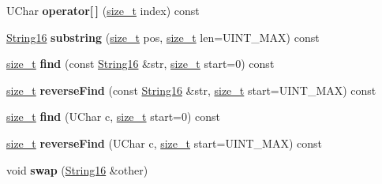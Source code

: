 \begin{DoxyCompactItemize}
\item 
\mbox{\label{classv8__inspector_1_1String16_aee5352dc73538db8d79e5294c1b04203}} 
U\+Char {\bfseries operator\mbox{[}$\,$\mbox{]}} (\mbox{\hyperlink{classsize__t}{size\+\_\+t}} index) const
\item 
\mbox{\label{classv8__inspector_1_1String16_a045c0dd80e0718d7dd9a0443d783c4ef}} 
\mbox{\hyperlink{classv8__inspector_1_1String16}{String16}} {\bfseries substring} (\mbox{\hyperlink{classsize__t}{size\+\_\+t}} pos, \mbox{\hyperlink{classsize__t}{size\+\_\+t}} len=U\+I\+N\+T\+\_\+\+M\+AX) const
\item 
\mbox{\label{classv8__inspector_1_1String16_aadd53e8ebc365e3df8ba64a9f5720875}} 
\mbox{\hyperlink{classsize__t}{size\+\_\+t}} {\bfseries find} (const \mbox{\hyperlink{classv8__inspector_1_1String16}{String16}} \&str, \mbox{\hyperlink{classsize__t}{size\+\_\+t}} start=0) const
\item 
\mbox{\label{classv8__inspector_1_1String16_ab0c7c214297bd4bf52c12ab1d07d7294}} 
\mbox{\hyperlink{classsize__t}{size\+\_\+t}} {\bfseries reverse\+Find} (const \mbox{\hyperlink{classv8__inspector_1_1String16}{String16}} \&str, \mbox{\hyperlink{classsize__t}{size\+\_\+t}} start=U\+I\+N\+T\+\_\+\+M\+AX) const
\item 
\mbox{\label{classv8__inspector_1_1String16_aeec2bc3331cc96ef6af2c78d6f6f9bca}} 
\mbox{\hyperlink{classsize__t}{size\+\_\+t}} {\bfseries find} (U\+Char c, \mbox{\hyperlink{classsize__t}{size\+\_\+t}} start=0) const
\item 
\mbox{\label{classv8__inspector_1_1String16_a06de0092541814d6bc837717d866141a}} 
\mbox{\hyperlink{classsize__t}{size\+\_\+t}} {\bfseries reverse\+Find} (U\+Char c, \mbox{\hyperlink{classsize__t}{size\+\_\+t}} start=U\+I\+N\+T\+\_\+\+M\+AX) const
\item 
\mbox{\label{classv8__inspector_1_1String16_a682dc2a9cdb4315f33a273cf44c08fcf}} 
void {\bfseries swap} (\mbox{\hyperlink{classv8__inspector_1_1String16}{String16}} \&other)
\item 

\end{DoxyCompactItemize}
